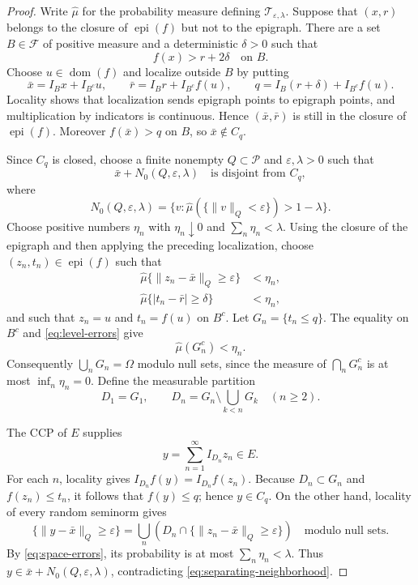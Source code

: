 \documentclass[11pt]{article}
\newcommand{\Tep}{\mathcal T_{\varepsilon,\lambda}}
\newcommand{\epi}{\operatorname{epi}}
\begin{document}
\begin{proof}
Write $\widehat\mu$ for the probability measure defining $\Tep$.  Suppose
that $(x,r)$ belongs to the closure of $\epi(f)$ but not to the epigraph.
There are a set $B\in\mathcal F$ of positive measure and a deterministic
$\delta>0$ such that
\[
f(x)>r+2\delta\quad\text{on }B.
\]
Choose $u\in\operatorname{dom}(f)$ and localize outside $B$ by putting
\[
\bar x=I_Bx+I_{B^c}u,
\qquad
\bar r=I_Br+I_{B^c}f(u),
\qquad
q=I_B(r+\delta)+I_{B^c}f(u).
\]
Locality shows that localization sends epigraph points to epigraph points,
and multiplication by indicators is continuous.  Hence
$(\bar x,\bar r)$ is still in the closure of $\epi(f)$.  Moreover
$f(\bar x)>q$ on $B$, so $\bar x\notin C_q$.

Since $C_q$ is closed, choose a finite nonempty $Q\subset\mathcal P$ and
$\varepsilon,\lambda>0$ such that
\begin{equation}
\label{eq:separating-neighborhood}
\bar x+N_0(Q,\varepsilon,\lambda)\quad\text{is disjoint from }C_q,
\end{equation}
where
\[
N_0(Q,\varepsilon,\lambda)
=\{v:\widehat\mu(\{\|v\|_Q<\varepsilon\})>1-\lambda\}.
\]
Choose positive numbers $\eta_n$ with $\eta_n\downarrow0$ and
$\sum_n\eta_n<\lambda$.  Using the closure of the epigraph and then applying
the preceding localization, choose $(z_n,t_n)\in\epi(f)$ such that
\begin{align}
\widehat\mu\{\|z_n-\bar x\|_Q\geq\varepsilon\}&<\eta_n,
\label{eq:space-errors}\\
\widehat\mu\{|t_n-\bar r|\geq\delta\}&<\eta_n,
\label{eq:level-errors}
\end{align}
and such that $z_n=u$ and $t_n=f(u)$ on $B^c$.  Let
$G_n=\{t_n\leq q\}$.  The equality on $B^c$ and
\eqref{eq:level-errors} give
\[
\widehat\mu(G_n^c)<\eta_n.
\]
Consequently $\bigcup_nG_n=\Omega$ modulo null sets, since the measure of
$\bigcap_nG_n^c$ is at most $\inf_n\eta_n=0$.  Define the measurable
partition
\[
D_1=G_1,
\qquad
D_n=G_n\setminus\bigcup_{k<n}G_k\quad(n\geq2).
\]

The CCP of $E$ supplies
\[
y=\sum_{n=1}^{\infty}I_{D_n}z_n\in E.
\]
For each $n$, locality gives
$I_{D_n}f(y)=I_{D_n}f(z_n)$.  Because $D_n\subset G_n$ and
$f(z_n)\leq t_n$, it follows that $f(y)\leq q$; hence $y\in C_q$.
On the other hand, locality of every random seminorm gives
\[
\{\|y-\bar x\|_Q\geq\varepsilon\}
=\bigcup_n\left(D_n\cap
\{\|z_n-\bar x\|_Q\geq\varepsilon\}\right)
\quad\text{modulo null sets}.
\]
By \eqref{eq:space-errors}, its probability is at most
$\sum_n\eta_n<\lambda$.  Thus
$y\in\bar x+N_0(Q,\varepsilon,\lambda)$, contradicting
\eqref{eq:separating-neighborhood}.
\end{proof}
\end{document}
